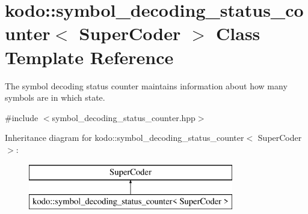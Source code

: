 \hypertarget{classkodo_1_1symbol__decoding__status__counter}{\section{kodo\-:\-:symbol\-\_\-decoding\-\_\-status\-\_\-counter$<$ Super\-Coder $>$ Class Template Reference}
\label{classkodo_1_1symbol__decoding__status__counter}
}


The symbol decoding status counter maintains information about how many symbols are in which state.  




{\ttfamily \#include $<$symbol\-\_\-decoding\-\_\-status\-\_\-counter.\-hpp$>$}

Inheritance diagram for kodo\-:\-:symbol\-\_\-decoding\-\_\-status\-\_\-counter$<$ Super\-Coder $>$\-:\begin{figure}[H]
\begin{center}
\leavevmode
\includegraphics[height=2.000000cm]{classkodo_1_1symbol__decoding__status__counter}
\end{center}
\end{figure}
